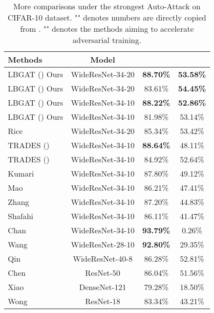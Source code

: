 \documentclass[10pt,twocolumn,letterpaper]{article}
\begin{document}
\begin{table*}[h]
	\centering
	\caption{More comparisons under the strongest Auto-Attack on CIFAR-10 dataset.  "\dag" denotes numbers are directly copied from \cite{croce2020reliable}. "" denotes the methods aiming to accelerate adversarial training.} 
	\vspace{0.1cm}
	\begin{tabular}{l|c|c|c}
		\textbf{Methods} & Model & & \\
		\hline
		\hline
		LBGAT () Ours                 &WideResNet-34-20 &\textbf{88.70\%} &\textbf{53.58\%} \\
		LBGAT () Ours                 &WideResNet-34-20 &83.61\% &\textbf{54.45\%} \\
		LBGAT () Ours                 &WideResNet-34-10 &\textbf{88.22\%} &\textbf{52.86\%} \\
		LBGAT () Ours                 &WideResNet-34-10 &81.98\% &53.14\% \\
		\hline
		\hline
		Rice \etal \cite{rice2020overfitting} \dag    &WideResNet-34-20 &85.34\%	&53.42\% \\
		TRADES ()                            &WideResNet-34-10 &\textbf{88.64\%} &48.11\%\\
		TRADES ()                            &WideResNet-34-10 &84.92\%    &52.64\% \\ 
		Kumari \etal \cite{kumari2019harnessing} \dag &WideResNet-34-10 &87.80\%	&49.12\% \\
		Mao \etal \cite{mao2019metric} \dag           &WideResNet-34-10 &86.21\%	&47.41\% \\
		Zhang \etal \cite{zhang2019you} \dag    &WideResNet-34-10 &87.20\%	&44.83\% \\
		Shafahi \etal \cite{shafahi2019adversarial} \dag  &WideResNet-34-10   &86.11\% &41.47\% \\
		Chan \etal \cite{chan2019jacobian} \dag                 &WideResNet-34-10 &\textbf{93.79\%} &0.26\% \\
		Wang \etal \cite{wang2019bilateral} \dag          &WideResNet-28-10 &\textbf{92.80\%} &29.35\% \\
		Qin \etal \cite{qin2019adversarial} \dag         &WideResNet-40-8  &86.28\% &52.81\% \\
		Chen \etal \cite{chen2020adversarial} \dag       &ResNet-50        &86.04\% &51.56\% \\
		Xiao \etal \cite{xiao2019enhancing} \dag         &DenseNet-121     &79.28\% &18.50\% \\
		Wong \etal \cite{wong2020fast} \dag              &ResNet-18        &83.34\% &43.21\% \\
		\hline
		\hline
	\end{tabular}
	\label{tab:more_aa_cifar10}
\end{table*}
\newpage
\end{document}
